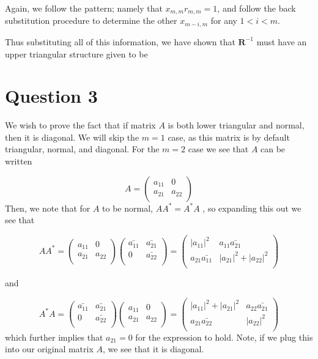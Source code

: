 \documentclass[a4paper,12pt]{article}
\begin{document}
Again, we follow the pattern; namely that $x_{m,m}r_{m,m}=1$, and follow the back substitution procedure to determine the other $x_{m-i,m}$ for any $1<i<m$.

Thus substituting all of this information, we have shown that $\textbf{R}^{-1}$ must have an upper triangular structure given to be


\section{Question 3}
We wish to prove the fact that if matrix $A$ is both lower triangular and normal, then it is diagonal. We will skip the $m=1$ case, as this matrix is by default triangular, normal, and diagonal. For the $m=2$ case we see that $A$ can be written

\begin{equation}
A=\begin{pmatrix}
a_{11} &0  \\
 a_{21} &a_{22} \\
\end{pmatrix}
\end{equation}
 Then, we note that for $A$ to be normal, $AA^* = A^*A$ , so expanding this out we see that
 
 \begin{equation}
 AA^*=\begin{pmatrix}
a_{11} &0  \\
 a_{21} &a_{22} \\
\end{pmatrix}\begin{pmatrix}
\bar{a_{11}} &\bar{ a_{21} } \\
0 &\bar{a_{22}} \\
\end{pmatrix} =
\begin{pmatrix}
| a_{11} |^2 &a_{11}\bar{ a_{21} } \\
a_{21}\bar{a_{11}} &| a_{21} |^2+ | a_{22} |^2 \\
\end{pmatrix}
 \end{equation} 
 
 and
 
 \begin{equation}
 A^* A=\begin{pmatrix}
\bar{a_{11}} &\bar{ a_{21} } \\
0 &\bar{a_{22}} \\
\end{pmatrix}\begin{pmatrix}
a_{11} &0  \\
 a_{21} &a_{22} \\
\end{pmatrix}=
\begin{pmatrix}
| a_{11} |^2 + | a_{21} |^2&a_{22}\bar{ a_{21} } \\
a_{21}\bar{a_{22}} & | a_{22} |^2 \\
\end{pmatrix}
 \end{equation} which further implies that $a_{21}=0$ for the expression to hold. Note, if we plug this into our original matrix $A$, we see that it is diagonal. 
 
\end{document}
